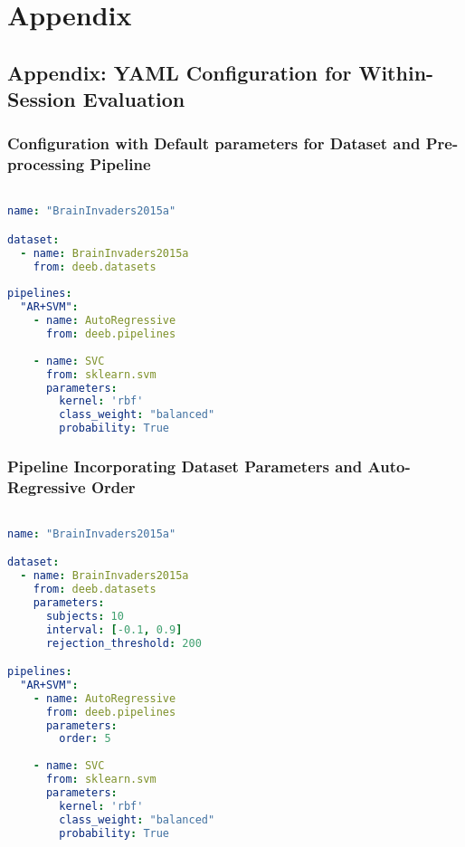 
\chapter{Appendix}
\label{chapter: Appendix}

\section{Appendix: YAML Configuration for Within-Session Evaluation}
\label{sec:Appendix:Within-Session}

\subsection{Configuration with Default parameters for Dataset and Pre-processing Pipeline}

\begin{lstlisting}[language=YAML, style=customyaml, caption={Benchmarking pipeline using the dataset's default parameters and auto-regressive features with SVM classification}, label={lst:yaml}]

name: "BrainInvaders2015a"

dataset:
  - name: BrainInvaders2015a
    from: deeb.datasets
    
pipelines:
  "AR+SVM":
    - name: AutoRegressive
      from: deeb.pipelines
     
    - name: SVC
      from: sklearn.svm
      parameters:
        kernel: 'rbf'
        class_weight: "balanced"
        probability: True
\end{lstlisting}

\subsection{Pipeline Incorporating Dataset Parameters and Auto-Regressive Order}
\begin{lstlisting}[language=YAML, style=customyaml, caption={Benchmarking pipeline using dataset's parameters and Auto Regressive order with SVM classification}, label={lst:yaml}]

name: "BrainInvaders2015a"

dataset:
  - name: BrainInvaders2015a
    from: deeb.datasets
    parameters:
      subjects: 10
      interval: [-0.1, 0.9]
      rejection_threshold: 200

pipelines:
  "AR+SVM":
    - name: AutoRegressive
      from: deeb.pipelines
      parameters:
        order: 5
      
    - name: SVC
      from: sklearn.svm
      parameters:
        kernel: 'rbf'
        class_weight: "balanced"
        probability: True
\end{lstlisting}


